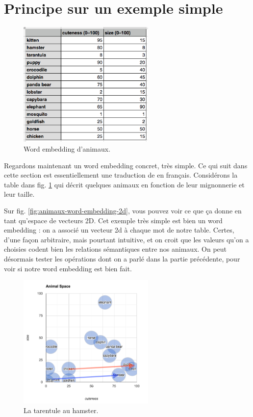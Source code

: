 \documentclass[11pt, a4paper]{report}
\begin{document}
  \section{Principe sur un exemple simple}

  \begin{figure}[h]
    \centering
    \includegraphics[width=0.6\textwidth]{animal-table.png}
    \caption{Word embedding d'animaux.}
    \label{fig:animaux-word-embedding}
  \end{figure}

Regardons maintenant un word embedding concret, très simple. Ce qui suit dans cette 
section est essentiellement une 
traduction de \cite[\textit{Understanding word vectors}, Allison PARISH]{understanding-word-vectors} 
en français. Considérons la table dans fig. \ref{fig:animaux-word-embedding} qui décrit quelques 
animaux en fonction de leur mignonnerie et leur taille. 

Sur fig. \ref{fig:animaux-word-embedding-2d}, vous pouvez voir 
ce que ça donne en tant qu'espace de vecteurs 2D. 
Cet exemple très simple est bien un word embedding : on a associé un vecteur 2d à chaque mot 
de notre table. Certes, d'une façon arbitraire, mais pourtant intuitive, et on croit que les 
valeurs qu'on a choisies codent bien les relations sémantiques entre nos animaux. On peut désormais 
tester les opérations dont on a parlé dans la partie précédente, pour voir si notre word embedding 
est bien fait. 
\begin{figure}[!htb]
  \centering
  \includegraphics[width=0.6\textwidth]{animal-space-dif.png}
  \caption{La tarentule au hamster.}
  \label{fig:tarentule-hamster}
\end{figure}
\end{document}

